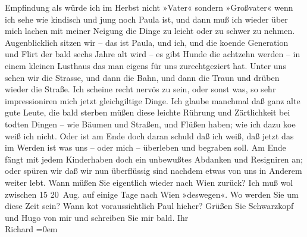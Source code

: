 \begin{ledgroupsized}[t]{13cm}
               Empfindung als würde ich im Herbst nicht »Vater« sondern »Großvater« wenn ich sehe
               wie kindisch und jung noch Paula ist, und dann
               muß ich wieder {\pb}über mich lachen
               mit meiner Neigung die Dinge zu leicht oder zu schwer zu nehmen. Augenblicklich
               sitzen wir – das ist Paula, und ich, und die ko{\geminationm}ende
                  Generation und Flirt der bald sechs Jahre {\pb}alt wird – es gibt Hunde die
               achtzehn werden – in einem kleinen Lusthaus das man eigens für uns zurechtgezi{\geminationm}ert hat. Unter uns sehen wir die Strasse, und dann die
               Bahn, und dann die Traun und drüben wieder die
               Straße.\pend
           \pstart
           Ich scheine recht nervös {\pb}zu sein,
               oder sonst was, so sehr impressioniren mich jetzt gleichgiltige Dinge. Ich glaube
               manchmal daß ganz alte gute Leute, die bald sterben müßen diese leichte Rührung und
               Zärtlichkeit bei todten Dingen – wie Bäumen und {\pb}Straßen, und Flüßen haben; wie ich
               dazu ko{\geminationm}e weiß ich nicht. Oder ist am Ende doch daran
               schuld daß ich weiß, daß jetzt das im Werden ist was uns – oder mich – überleben und
               begraben soll. {\pb}Am Ende fängt mit
               jedem Kinderhaben doch ein unbewußtes Abdanken und Resigniren an; oder spüren wir daß
               wir nun überflüssig sind nachdem etwas von uns in {\pb}Anderem weiter lebt.\pend
           \pstart
           Wann müßen Sie eigentlich wieder nach Wien zurück?
               Ich muß wol zwischen 15{ }{\kaufmannsund}{ }20 Aug. auf einige Tage nach Wien »deswegen«. Wo werden Sie um diese Zeit sein? Wann ko{\geminationm}t voraussichtlich Paul hieher? Grüßen {\pb}Sie Schwarzkopf und Hugo von mir und
               schreiben Sie mir bald.\pend
           \pstart
           Ihr{\\[\baselineskip]}\spacefill\mbox{Richard}\pend
           \leftskip=0em{}\endnumbering{}\end{ledgroupsized}  \newcommand{\dateiname}{L00686}\newcommand{\titel}{Richard Beer-Hofmann an Arthur Schnitzler, 13. 6. 1897}\newcommand{\editorInnen}{Martin Anton Müller und Gerd-Hermann Susen}
      